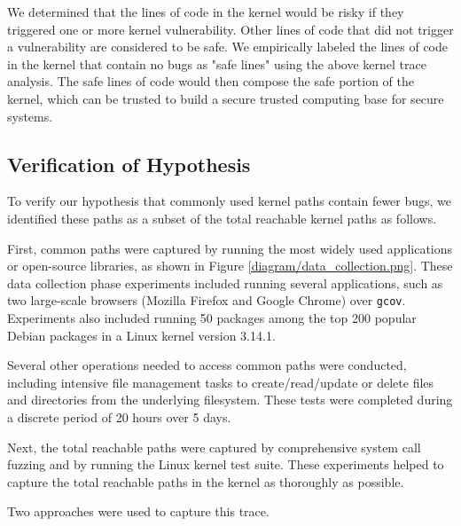 We determined that the lines of code in the kernel would be risky
if they triggered one or more kernel vulnerability. Other lines of code
that did not trigger a vulnerability are considered to be safe. We empirically
 labeled the lines of code in the kernel that contain no bugs as "safe lines"
using the above kernel trace analysis.
The safe lines of code would then compose the safe portion of the kernel, which can be trusted to build a secure trusted computing base for secure systems.

\subsection{Verification of Hypothesis}
\label{Verification-of-Hypothesis}

To verify our hypothesis that commonly used kernel paths contain fewer bugs,
we identified these paths as a subset of the total reachable kernel paths as follows.

First, common paths were captured by running the most widely used applications
or open-source libraries, as shown in Figure \ref{diagram/data_collection.png}.
These data collection phase experiments included running several applications,
such as two large-scale browsers (Mozilla Firefox and Google Chrome)
 over \texttt{gcov}. Experiments also included running 50 packages among
 the top 200 popular Debian packages \cite{Top-Packages}
 in a Linux kernel version 3.14.1.

Several other operations needed to access common paths were conducted, including
intensive file management tasks to create/read/update or delete files and
directories from the underlying filesystem. These tests were completed
during a discrete period of 20 hours over 5 days.

Next, the total reachable paths were captured by comprehensive system call
fuzzing and by running the Linux kernel test suite. These experiments helped
 to capture the total reachable paths in the kernel as thoroughly as possible.

Two approaches were used to capture this trace.

